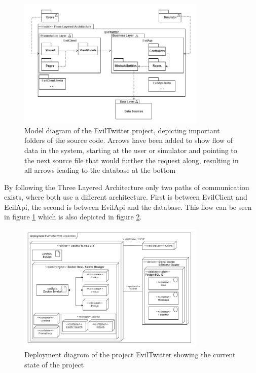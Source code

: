 \documentclass[report/main.tex]{subfiles}
\begin{document}
        \begin{figure}[H]
            \centering
            \includegraphics[width=0.8\textwidth]{report/images/EvilTwitter-Model Diagram - Evil Corp.jpg}
            \caption{Model diagram of the EvilTwitter project, depicting important folders of the source code. Arrows have been added to show flow of data in the system, starting at the user or simulator and pointing to the next source file that would further the request along, resulting in all arrows leading to the database at the bottom}
            \label{fig:model-diagram}
        \end{figure}
        
        By following the Three Layered Architecture only two paths of communication exists, where both use a different architecture. First is between EvilClient and EcilApi, the second is between EvilApi and the database. This flow can be seen in figure \ref{fig:model-diagram} which is also depicted in figure \ref{fig:deployment-diagram}.
        
        \begin{figure}
            \centering
            \includegraphics[width=0.8\textwidth]{report/images/EvilTwitter-Deployment Diagram - Evil Corp.jpg}
            \caption{Deployment diagrom of the project EvilTwitter showing the current state of the project}
            \label{fig:deployment-diagram}
        \end{figure}
        
\end{document}
